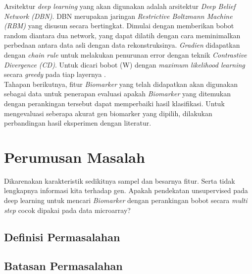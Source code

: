 
Arsitektur \textit{deep learning} yang akan digunakan adalah arsitektur \textit{Deep Belief Network (DBN)}. DBN merupakan jaringan \textit{Restrictive Boltzmann Machine (RBM)} yang disusun secara bertingkat. Dimulai dengan memberikan bobot random diantara dua network, yang dapat dilatih dengan cara meminimalkan perbedaan antara data asli dengan data rekonstruksinya. \textit{Gradien} didapatkan dengan \textit{chain rule} untuk melakukan penurunan error dengan teknik \textit{Contrastive Divergence (CD)}. Untuk dicari bobot (W) dengan \textit{maximum likelihood learning}  secara \textit{greedy} pada tiap layernya \citep{hinton2006reducing}. \\

Tahapan berikutnya, fitur \textit{Biomarker} yang telah didapatkan akan digunakan sebagai data untuk penerapan evaluasi apakah \textit{Biomarker} yang ditemukan dengan perankingan tersebut dapat memperbaiki hasil klasifikasi. Untuk mengevaluasi seberapa akurat gen biomarker yang dipilih, dilakukan perbandingan hasil eksperimen dengan literatur. \\






\section{Perumusan Masalah}
Dikarenakan karakteristik sedikitnya sampel dan besarnya fitur. Serta tidak lengkapnya informasi kita terhadap gen. Apakah pendekatan unsupervised pada deep learning untuk mencari \textit{Biomarker} dengan perankingan bobot secara \textit{multi step} cocok dipakai pada data microarray?


\subsection{Definisi Permasalahan}


\subsection{Batasan Permasalahan}

